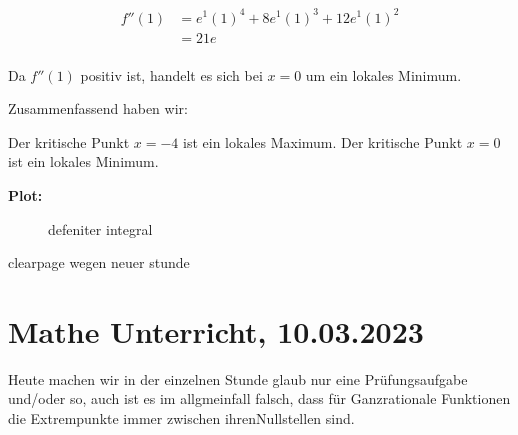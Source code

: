 \documentclass{report}
\begin{document}
\begin{align*}
f''(1) &= e^1 (1)^4 + 8 e^1 (1)^3 + 12 e^1 (1)^2 \\
&= 21e \\
\end{align*}

Da $f''(1)$ positiv ist, handelt es sich bei $x=0$ um ein lokales Minimum.

Zusammenfassend haben wir:

Der kritische Punkt $x=-4$ ist ein lokales Maximum.
Der kritische Punkt $x=0$ ist ein lokales Minimum.


\textbf{Plot:}


\vspace{40pt}

\begin{figure}[htbp]
    \centering
    \caption{defeniter integral}
    \label{fig:def-int}
\end{figure}
    

clearpage wegen neuer stunde
\clearpage

\section{Mathe Unterricht, 10.03.2023}
Heute machen wir in der einzelnen Stunde glaub nur eine Prüfungsaufgabe
und/oder so, auch ist es im allgmeinfall falsch, dass für Ganzrationale
Funktionen die Extrempunkte immer zwischen ihrenNullstellen sind.
\end{document}

